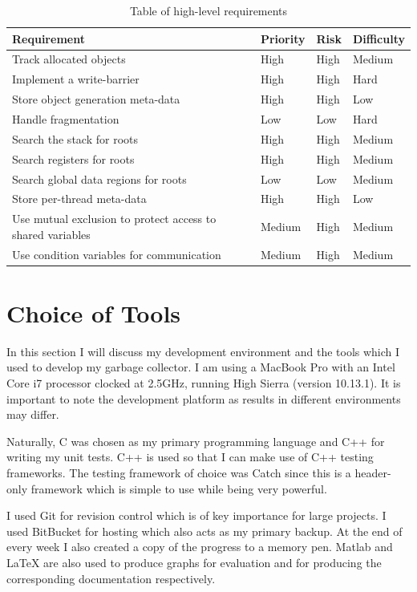 \documentclass[../diss.tex]{subfiles}
\begin{document}
\begin{table}
    \centering
    \begin{tabular}{| l | l | l | l |}
        \hline
         \bf{Requirement} & \bf{Priority} & \bf{Risk} & \bf{Difficulty} \\ \hline
         Track allocated objects & High & High & Medium \\ \hline
         Implement a write-barrier & High & High & Hard \\ \hline
         Store object generation meta-data & High & High & Low \\ \hline
         Handle fragmentation & Low & Low & Hard \\ \hline
         Search the stack for roots & High & High & Medium \\ \hline
         Search registers for roots & High & High & Medium \\ \hline
         Search global data regions for roots & Low & Low & Medium \\ \hline
         Store per-thread meta-data & High & High & Low \\ \hline
         Use mutual exclusion to protect access to shared variables & Medium & High & Medium \\ \hline
         Use condition variables for communication & Medium & High & Medium \\ \hline
    \end{tabular}
    \caption{Table of high-level requirements}
    \label{tab:requirements}
\end{table}

\section{Choice of Tools} \label{sec:tools}

In this section I will discuss my development environment and the tools which I used to develop my garbage collector. I am using a MacBook Pro with an Intel Core i7 processor clocked at 2.5GHz, running High Sierra (version 10.13.1). It is important to note the development platform as results in different environments may differ.

Naturally, C was chosen as my primary programming language and C++ for writing my unit tests. C++ is used so that I can make use of C++ testing frameworks. The testing framework of choice was Catch since this is a header-only framework which is simple to use while being very powerful. 

I used Git for revision control which is of key importance for large projects. I used BitBucket for hosting which also acts as my primary backup. At the end of every week I also created a copy of the progress to a memory pen. Matlab and LaTeX are also used to produce graphs for evaluation and for producing the corresponding documentation respectively.
\end{document}
